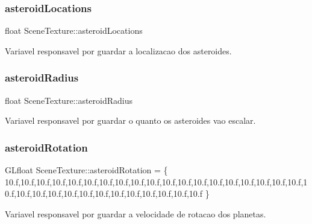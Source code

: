 \mbox{\label{class_scene_texture_a626f618c6ec872833e7ed8d7ba3b8dc2}} 
\subsubsection{\texorpdfstring{asteroidLocations}{asteroidLocations}}
{\footnotesize\ttfamily float Scene\+Texture\+::asteroid\+Locations\hspace{0.3cm}{\ttfamily [static]}}



Variavel responsavel por guardar a localizacao dos asteroides. 

\mbox{\label{class_scene_texture_ae5c021e52e6e1ae0ba014198fc698513}} 
\subsubsection{\texorpdfstring{asteroidRadius}{asteroidRadius}}
{\footnotesize\ttfamily float Scene\+Texture\+::asteroid\+Radius\hspace{0.3cm}{\ttfamily [static]}}



Variavel responsavel por guardar o quanto os asteroides vao escalar. 

\mbox{\label{class_scene_texture_acd91229942db42f5d356451edc2bd2da}} 
\subsubsection{\texorpdfstring{asteroidRotation}{asteroidRotation}}
{\footnotesize\ttfamily G\+Lfloat Scene\+Texture\+::asteroid\+Rotation = \{ 10.f,10.f,10.f,10.f,10.f,10.f,10.f,10.f,10.f,10.f,10.f,10.f,10.f,10.f,10.f,10.f,10.f,10.f,10.f,10.f,10.f,10.f,10.f,10.f,10.f,10.f,10.f,10.f,10.f,10.f,10.f,10.f \}\hspace{0.3cm}{\ttfamily [static]}}



Variavel responsavel por guardar a velocidade de rotacao dos planetas. 

